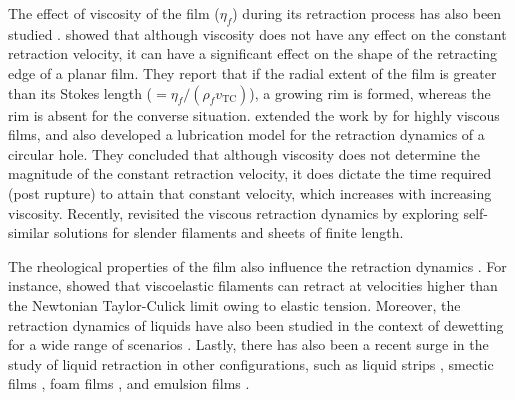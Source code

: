 The effect of viscosity of the film ($\eta_f$) during its retraction process has also been studied \citep{debregeas-1995-prl, debregeas-1998-science}. \citet{brenner-1999-pof} showed that although viscosity does not have any effect on the constant retraction velocity, it can have a significant effect on the shape of the retracting edge of a planar film. They report that if the radial extent of the film is greater than its Stokes length ($= \eta_f/(\rho_f v_{\text{TC}})$), a growing rim is formed, whereas the rim is absent for the converse situation. \citet{savva-2009-jfm} extended the work by \citet{brenner-1999-pof} for highly viscous films, and also developed a lubrication model for the retraction dynamics of a circular hole. They concluded that although viscosity does not determine the magnitude of the constant retraction velocity, it does dictate the time required (post rupture) to attain that constant velocity, which increases with increasing viscosity. Recently, \citet{pierson2020revisiting, deka2020revisiting} revisited the viscous retraction dynamics by exploring self-similar solutions for slender filaments and sheets of finite length. 

The rheological properties of the film also influence the retraction dynamics \citep{kdv-1999-pre, tammaro-2018-langmuir, villone-2019-jnnfm, kamat-2020-jfm}. For instance, \cite{sen_lohse_2021} showed that viscoelastic filaments can retract at velocities higher than the Newtonian Taylor-Culick limit owing to elastic tension. Moreover, the retraction dynamics of liquids have also been studied in the context of dewetting for a wide range of scenarios \citep{redon-1991-prl, brochardwyart-1993-langmuir, shull-1994-langmuir, andrieu-1996-jadhesion, lambooy-1996-prl, haidara-1998-langmuir, buguin-1999-prl, peron-2012-langmuir, peschka-2018-scirep, kim2020raindrop}. Lastly, there has also been a recent surge in the study of liquid retraction in other configurations, such as liquid strips \citep{lv-2015-jfm}, smectic films \citep{trittel-2013-pof}, foam films \citep{petit-2015-jfm}, and emulsion films \citep{vernay-2015-prl}. 

